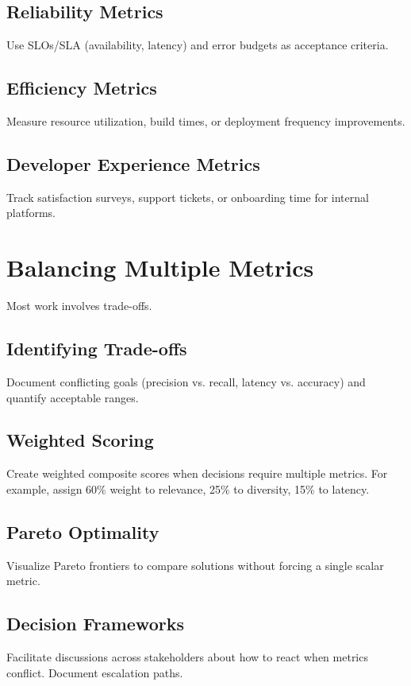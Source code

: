 \subsection{Reliability Metrics}
Use SLOs/SLA (availability, latency) and error budgets as acceptance criteria.

\subsection{Efficiency Metrics}
Measure resource utilization, build times, or deployment frequency improvements.

\subsection{Developer Experience Metrics}
Track satisfaction surveys, support tickets, or onboarding time for internal platforms.

\section{Balancing Multiple Metrics}
\label{sec:balancing-metrics}

Most work involves trade-offs.

\subsection{Identifying Trade-offs}
Document conflicting goals (precision vs. recall, latency vs. accuracy) and quantify acceptable ranges.

\subsection{Weighted Scoring}
Create weighted composite scores when decisions require multiple metrics. For example, assign 60\% weight to relevance, 25\% to diversity, 15\% to latency.

\subsection{Pareto Optimality}
Visualize Pareto frontiers to compare solutions without forcing a single scalar metric.

\subsection{Decision Frameworks}
Facilitate discussions across stakeholders about how to react when metrics conflict. Document escalation paths.

